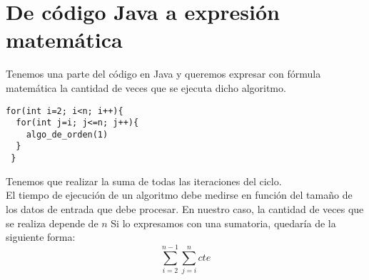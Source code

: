 \section{De código Java a expresión matemática}

Tenemos una parte del código en Java y queremos expresar con fórmula matemática la cantidad de veces que se ejecuta dicho algoritmo.\\

\begin{verbatim}
for(int i=2; i<n; i++){
  for(int j=i; j<=n; j++){
    algo_de_orden(1)
  }
 }
\end{verbatim}

Tenemos que realizar la suma de todas las iteraciones del ciclo.\\El tiempo de ejecución de un algoritmo debe medirse en función del tamaño de los datos de entrada que debe procesar. En nuestro caso, la cantidad de veces que se realiza depende de $n$
Si lo expresamos con una sumatoria, quedaría de la siguiente forma:\\
					      \[ \sum_{i=2}^{n-1}{\sum_{j=i}^{n}{cte}} \]

